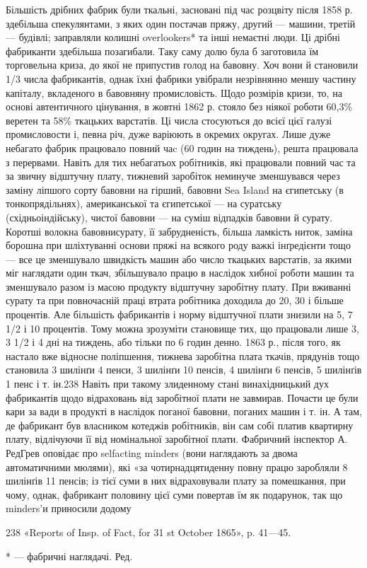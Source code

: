Більшість дрібних фабрик були ткальні, засновані під час розцвіту
після 1858 р. здебільша спекулянтами, з яких один постачав
пряжу, другий — машини, третій — будівлі; заправляли колишні
overlookers* та інші немаєтні люди. Ці дрібні фабриканти здебільша
позагибали. Таку саму долю була б заготовила їм торговельна
криза, до якої не припустив голод на бавовну. Хоч вони
й становили 1/3 числа фабрикантів, однак їхні фабрики увібрали
незрівнянно меншу частину капіталу, вкладеного в бавовняну промисловість.
Щодо розмірів кризи, то, на основі автентичного
цінування, в жовтні 1862 р. стояло без ніякої роботи 60,3\%
веретен та 58\% ткацьких варстатів. Ці числа стосуються до всієї
цієї галузі промисловости і, певна річ, дуже варіюють в окремих
округах. Лише дуже небагато фабрик працювало повний чаc (60 годин на тиждень), решта працювала з
перервами. Навіть
для тих небагатьох робітників, які працювали повний час
та за звичну відштучну плату, тижневий заробіток неминуче зменшувався
через заміну ліпшого сорту бавовни на гірший, бавовни
Sea Island на єгипетську (в тонкопрядільнях), американської та
єгипетської — на суратську (східньоіндійську), чистої бавовни —
на суміш відпадків бавовни й сурату. Коротші волокна бавовнисурату,
її забрудненість, більша ламкість ниток, заміна борошна
при шліхтуванні основи пряжі на всякого роду важкі інґредієнти
тощо — все це зменшувало швидкість машин або число ткацьких
варстатів, за якими міг наглядати один ткач, збільшувало працю
в наслідок хибної роботи машин та зменшувало разом із масою
продукту відштучну заробітну плату. При вживанні сурату та
при повночасній праці втрата робітника доходила до 20, 30 і
більше процентів. Але більшість фабрикантів і норму відштучної
плати знизили на 5, 7 1/2 і 10 процентів. Тому можна зрозуміти
становище тих, що працювали лише 3, 3 1/2 і 4 дні на тиждень,
або тільки по 6 годин денно. 1863 р., після того, як настало вже
відносне поліпшення, тижнева заробітна плата ткачів, прядунів
тощо становила 3 шилінґи 4 пенси, 3 шилінґи 10 пенсів, 4 шилінґи
6 пенсів, 5 шилінґів 1 пенс і т. ін.238 Навіть при такому злиденному
стані винахідницький дух фабрикантів щодо відраховань
від заробітної плати не завмирав. Почасти це були кари за вади
в продукті в наслідок поганої бавовни, поганих машин і т. ін.
А там, де фабрикант був власником котеджів робітників, він сам
собі платив квартирну плату, відлічуючи її від номінальної
заробітної плати. Фабричний інспектор А. РедГрев оповідає
про selfacting minders (вони наглядають за двома автоматичними
мюлями), які «за чотирнадцятиденну повну працю заробляли
8 шилінґів 11 пенсів; із тієї суми в них відраховували плату за
помешкання, при чому, однак, фабрикант половину цієї суми
повертав їм як подарунок, так що minders’и приносили додому

238 «Reports of Insp. of Fact, for 31 st October 1865», p. 41—45.

* — фабричні наглядачі. Ред.
